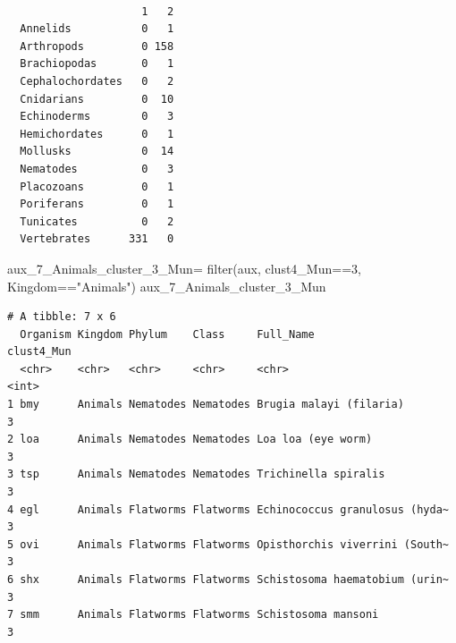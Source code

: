 \documentclass[
  letterpaper,
  DIV=11,
  numbers=noendperiod]{scrreprt}
\newenvironment{Shaded}{}{}
\newcommand{\DecValTok}[1]{\textcolor[rgb]{0.82,0.60,0.40}{#1}}
\newcommand{\FunctionTok}[1]{\textcolor[rgb]{0.38,0.69,0.94}{#1}}
\newcommand{\NormalTok}[1]{\textcolor[rgb]{0.67,0.70,0.75}{#1}}
\newcommand{\OtherTok}[1]{\textcolor[rgb]{0.15,0.68,0.38}{#1}}
\newcommand{\SpecialCharTok}[1]{\textcolor[rgb]{0.34,0.71,0.76}{#1}}
\newcommand{\StringTok}[1]{\textcolor[rgb]{0.60,0.76,0.47}{#1}}
\begin{document}
\begin{Shaded}
\end{Shaded}

\begin{verbatim}
                  
                     1   2
  Annelids           0   1
  Arthropods         0 158
  Brachiopodas       0   1
  Cephalochordates   0   2
  Cnidarians         0  10
  Echinoderms        0   3
  Hemichordates      0   1
  Mollusks           0  14
  Nematodes          0   3
  Placozoans         0   1
  Poriferans         0   1
  Tunicates          0   2
  Vertebrates      331   0
\end{verbatim}

\begin{Shaded}
\begin{Highlighting}[]
\NormalTok{aux\_7\_Animals\_cluster\_3\_Mun}\OtherTok{=} \FunctionTok{filter}\NormalTok{(aux,}
\NormalTok{                                clust4\_Mun}\SpecialCharTok{==}\DecValTok{3}\NormalTok{,}
\NormalTok{                                Kingdom}\SpecialCharTok{==}\StringTok{"Animals"}\NormalTok{)}
\NormalTok{aux\_7\_Animals\_cluster\_3\_Mun}
\end{Highlighting}
\end{Shaded}

\begin{verbatim}
# A tibble: 7 x 6
  Organism Kingdom Phylum    Class     Full_Name                      clust4_Mun
  <chr>    <chr>   <chr>     <chr>     <chr>                               <int>
1 bmy      Animals Nematodes Nematodes Brugia malayi (filaria)                 3
2 loa      Animals Nematodes Nematodes Loa loa (eye worm)                      3
3 tsp      Animals Nematodes Nematodes Trichinella spiralis                    3
4 egl      Animals Flatworms Flatworms Echinococcus granulosus (hyda~          3
5 ovi      Animals Flatworms Flatworms Opisthorchis viverrini (South~          3
6 shx      Animals Flatworms Flatworms Schistosoma haematobium (urin~          3
7 smm      Animals Flatworms Flatworms Schistosoma mansoni                     3
\end{verbatim}
\end{document}
